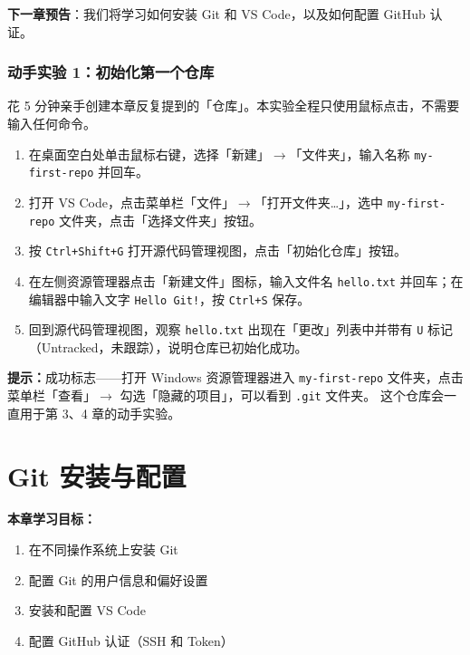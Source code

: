 \documentclass[12pt,a4paper,openany]{ctexbook}
\begin{document}
\textbf{下一章预告}：我们将学习如何安装 Git 和 VS Code，以及如何配置 GitHub 认证。
\medskip

\subsection*{动手实验 1：初始化第一个仓库}

花 5 分钟亲手创建本章反复提到的「仓库」。本实验全程只使用鼠标点击，不需要输入任何命令。

\medskip
\begin{enumerate}[leftmargin=1.5em]
  \item 在桌面空白处单击鼠标右键，选择「新建」$\to$「文件夹」，输入名称 \texttt{my-first-repo} 并回车。
  \item 打开 VS Code，点击菜单栏「文件」$\to$「打开文件夹…」，选中 \texttt{my-first-repo} 文件夹，点击「选择文件夹」按钮。
  \item 按 \texttt{Ctrl+Shift+G} 打开源代码管理视图，点击「初始化仓库」按钮。
  \item 在左侧资源管理器点击「新建文件」图标，输入文件名 \texttt{hello.txt} 并回车；在编辑器中输入文字 \texttt{Hello Git!}，按 \texttt{Ctrl+S} 保存。
  \item 回到源代码管理视图，观察 \texttt{hello.txt} 出现在「更改」列表中并带有 \texttt{U} 标记（Untracked，未跟踪），说明仓库已初始化成功。
\end{enumerate}
\medskip

\medskip
\noindent\textbf{提示：}成功标志——打开 Windows 资源管理器进入 \texttt{my-first-repo} 文件夹，点击菜单栏「查看」$\to$ 勾选「隐藏的项目」，可以看到 \texttt{.git} 文件夹。
这个仓库会一直用于第 3、4 章的动手实验。
\medskip

\chapter{Git 安装与配置}

\medskip
\noindent\textbf{本章学习目标：}
\begin{enumerate}[leftmargin=1.5em]
  \item 在不同操作系统上安装 Git
  \item 配置 Git 的用户信息和偏好设置
  \item 安装和配置 VS Code
  \item 配置 GitHub 认证（SSH 和 Token）
\end{enumerate}
\medskip
\end{document}
